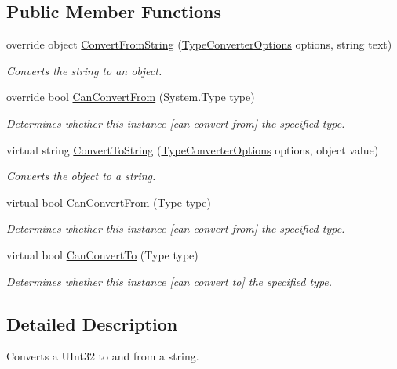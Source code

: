 \subsection*{Public Member Functions}
\begin{DoxyCompactItemize}
\item 
override object \hyperlink{a00185_a15686325b6bfa7648b65f201ecf50cd2}{Convert\-From\-String} (\hyperlink{a00180}{Type\-Converter\-Options} options, string text)
\begin{DoxyCompactList}\small\item\em Converts the string to an object. \end{DoxyCompactList}\item 
override bool \hyperlink{a00185_a2acfe170e7562c745bcb0aaff3d74020}{Can\-Convert\-From} (System.\-Type type)
\begin{DoxyCompactList}\small\item\em Determines whether this instance \mbox{[}can convert from\mbox{]} the specified type. \end{DoxyCompactList}\item 
virtual string \hyperlink{a00090_a36cb2f9b24f15a671293f3a722324c27}{Convert\-To\-String} (\hyperlink{a00180}{Type\-Converter\-Options} options, object value)
\begin{DoxyCompactList}\small\item\em Converts the object to a string. \end{DoxyCompactList}\item 
virtual bool \hyperlink{a00090_a470d21adaa704eb281250dbd112ff91a}{Can\-Convert\-From} (Type type)
\begin{DoxyCompactList}\small\item\em Determines whether this instance \mbox{[}can convert from\mbox{]} the specified type. \end{DoxyCompactList}\item 
virtual bool \hyperlink{a00090_acb65bd8c8199d88d5b1629ae35d18514}{Can\-Convert\-To} (Type type)
\begin{DoxyCompactList}\small\item\em Determines whether this instance \mbox{[}can convert to\mbox{]} the specified type. \end{DoxyCompactList}\end{DoxyCompactItemize}


\subsection{Detailed Description}
Converts a U\-Int32 to and from a string. 



